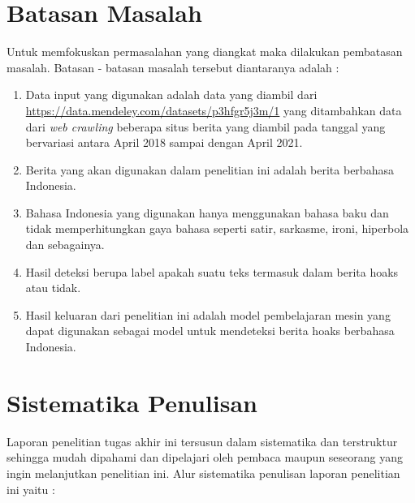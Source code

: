 \section{Batasan Masalah}
\label{sec:batasanmasalah}

Untuk memfokuskan permasalahan yang diangkat maka dilakukan pembatasan masalah. Batasan - batasan masalah tersebut diantaranya adalah :

\begin{enumerate}[itemsep=-0.2em]
      \item Data input yang digunakan adalah data yang diambil dari \url{https://data.mendeley.com/datasets/p3hfgr5j3m/1} yang ditambahkan data dari \textit{web crawling} beberapa situs berita yang diambil pada tanggal yang bervariasi antara April 2018 sampai dengan April 2021.

      \item Berita yang akan digunakan dalam penelitian ini adalah berita berbahasa Indonesia.

      \item Bahasa Indonesia yang digunakan hanya menggunakan bahasa baku dan tidak memperhitungkan gaya bahasa seperti satir, sarkasme, ironi, hiperbola dan sebagainya.

      \item Hasil deteksi berupa label apakah suatu teks termasuk dalam berita hoaks atau tidak.

      \item Hasil keluaran dari penelitian ini adalah model pembelajaran mesin yang dapat digunakan sebagai model untuk mendeteksi berita hoaks berbahasa Indonesia.

\end{enumerate}

\section{Sistematika Penulisan}
\label{sec:sistematikapenulisan}

Laporan penelitian tugas akhir ini tersusun dalam sistematika dan terstruktur sehingga mudah dipahami dan dipelajari oleh pembaca maupun seseorang yang ingin melanjutkan penelitian ini. Alur sistematika penulisan laporan penelitian ini yaitu :

